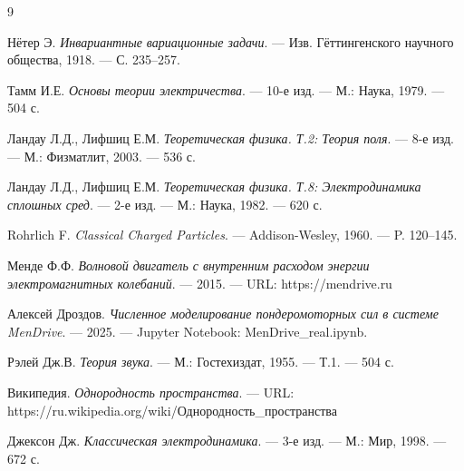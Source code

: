 \documentclass[a4paper,12pt]{article}
\begin{document}

\begin{thebibliography}{9}

Нётер Э. \textit{Инвариантные вариационные задачи}. --- Изв. Гёттингенского
научного общества, 1918. --- С. 235--257.

Тамм И.Е. \textit{Основы теории электричества}. --- 10-е изд. --- М.: Наука,
1979. --- 504 с.

Ландау Л.Д., Лифшиц Е.М. \textit{Теоретическая физика. Т.2: Теория поля}. ---
8-е изд. --- М.: Физматлит, 2003. --- 536 с.

Ландау Л.Д., Лифшиц Е.М. \textit{Теоретическая физика. Т.8: Электродинамика
сплошных сред}. --- 2-е изд. --- М.: Наука, 1982. --- 620 с.

Rohrlich F. \textit{Classical Charged Particles}. --- Addison-Wesley, 1960. ---
P. 120--145.

Менде Ф.Ф. \textit{Волновой двигатель с внутренним расходом энергии
электромагнитных колебаний}. --- 2015. --- URL: https://mendrive.ru

Алексей Дроздов. \textit{Численное моделирование пондеромоторных сил в системе MenDrive}. ---
2025. --- Jupyter Notebook: MenDrive\_real.ipynb.

Рэлей Дж.В. \textit{Теория звука}. --- М.: Гостехиздат, 1955. --- Т.1. --- 504 с.

Википедия. \textit{Однородность пространства}. --- URL:
https://ru.wikipedia.org/wiki/Однородность\_пространства

Джексон Дж. \textit{Классическая электродинамика}. --- 3-е изд. --- М.: Мир,
1998. --- 672 с.

\end{thebibliography}
\end{document}
